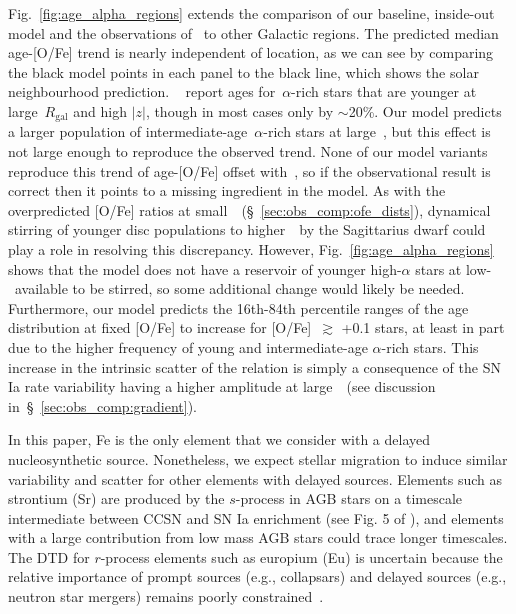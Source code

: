 \documentclass[draft2.tex]{subfiles}
\begin{document}
Fig.~\ref{fig:age_alpha_regions} extends the comparison of our baseline, 
inside-out model and the observations of~\citet{Feuillet2019} to other 
Galactic regions. 
The predicted median age-[O/Fe] trend is nearly independent of location, as we 
can see by comparing the black model points in each panel to the black line, 
which shows the solar neighbourhood prediction. 
~\citet{Feuillet2019} report ages for~$\alpha$-rich stars that are younger at 
large~$R_\text{gal}$ and high $\left|z\right|$, though in most cases only by 
$\sim$20\%. 
Our model predicts a larger population of intermediate-age~$\alpha$-rich stars 
at large~\rgal, but this effect is not large enough to reproduce the observed 
trend. 
None of our model variants reproduce this trend of age-[O/Fe] offset with~\absz, 
so if the observational result is correct then it points to a missing 
ingredient in the model. 
As with the overpredicted [O/Fe] ratios at 
small~\rgal~(\S~\ref{sec:obs_comp:ofe_dists}), dynamical stirring of younger 
disc populations to higher~\absz~by the Sagittarius dwarf could play a role in 
resolving this discrepancy. 
However, Fig.~\ref{fig:age_alpha_regions} shows that the model does not have a 
reservoir of younger high-$\alpha$ stars at low-\absz~available to be stirred, 
so some additional change would likely be needed. 
Furthermore, our model predicts the 16th-84th percentile ranges of the age 
distribution at fixed [O/Fe] to increase for [O/Fe]~$\gtrsim$ +0.1 stars, at 
least in part due to the higher frequency of young and intermediate-age 
$\alpha$-rich stars. 
This increase in the intrinsic scatter of the relation is simply a consequence 
of the SN Ia rate variability having a higher amplitude at large~\rgal~(see 
discussion in~\S~\ref{sec:obs_comp:gradient}). 
\par 
In this paper, Fe is the only element that we consider with a delayed 
nucleosynthetic source. 
Nonetheless, we expect stellar migration to induce similar variability and 
scatter for other elements with delayed sources. 
Elements such as strontium (Sr) are produced by the $s$-process in AGB stars on 
a timescale intermediate between CCSN and SN Ia enrichment (see Fig. 5 of 
\citealp{Johnson2020}), and elements with a large contribution from low mass 
AGB stars could trace longer timescales. 
The DTD for $r$-process elements such as europium (Eu) is uncertain because the 
relative importance of prompt sources (e.g., collapsars) and delayed sources 
(e.g., neutron star mergers) remains poorly constrained~\citep{Cote2019, 
Mishenina2019, Siegel2019, Vincenzo2021b}. 
\end{document}

